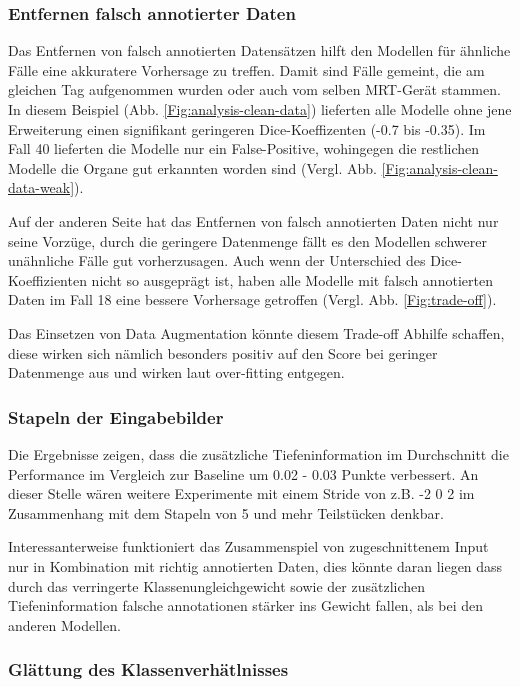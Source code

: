 \subsubsection{Entfernen falsch annotierter Daten}

Das Entfernen von falsch annotierten Datensätzen hilft den Modellen für ähnliche Fälle eine akkuratere Vorhersage zu treffen. Damit sind Fälle gemeint, die am gleichen Tag aufgenommen wurden oder auch vom selben MRT-Gerät stammen. In diesem Beispiel (Abb. \ref{Fig:analysis-clean-data}) lieferten alle Modelle ohne jene Erweiterung einen signifikant geringeren Dice-Koeffizenten (-0.7 bis -0.35). Im Fall 40 lieferten die Modelle nur ein False-Positive, wohingegen die restlichen Modelle die Organe gut erkannten worden sind (Vergl. Abb. \ref{Fig:analysis-clean-data-weak}).

Auf der anderen Seite hat das Entfernen von falsch annotierten Daten nicht nur seine Vorzüge, durch die geringere Datenmenge fällt es den Modellen schwerer unähnliche Fälle gut vorherzusagen. Auch wenn der Unterschied des Dice-Koeffizienten nicht so ausgeprägt ist, haben alle Modelle mit falsch annotierten Daten im Fall 18 eine bessere Vorhersage getroffen (Vergl. Abb. \ref{Fig:trade-off}).

Das Einsetzen von Data Augmentation könnte diesem Trade-off Abhilfe schaffen, diese wirken sich nämlich besonders positiv auf den Score bei geringer Datenmenge aus und wirken laut \citet{U-Net} over-fitting entgegen. 

\subsubsection{Stapeln der Eingabebilder}

Die Ergebnisse zeigen, dass die zusätzliche Tiefeninformation im Durchschnitt die Performance im Vergleich zur Baseline um 0.02 - 0.03 Punkte verbessert. An dieser Stelle wären weitere Experimente mit einem Stride von z.B. -2 0 2 im Zusammenhang mit dem Stapeln von 5 und mehr Teilstücken denkbar. 

Interessanterweise funktioniert das Zusammenspiel von zugeschnittenem Input nur in Kombination mit richtig annotierten Daten, dies könnte daran liegen dass durch das verringerte Klassenungleichgewicht sowie der zusätzlichen Tiefeninformation falsche annotationen stärker ins Gewicht fallen, als bei den anderen Modellen.

\subsubsection{Glättung des Klassenverhätlnisses}

